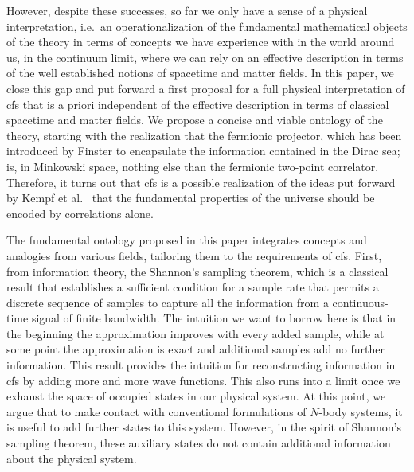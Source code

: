\documentclass[reqno,11pt]{amsart}
\numberwithin{equation}{section}
\begin{document}
However, despite these successes, so far we only have a sense of a physical interpretation, i.e.~an operationalization
of the fundamental mathematical objects of the theory in terms of concepts we have experience with in the world around us,
in the continuum limit, where we can rely on an effective description in terms of the well established notions of spacetime and matter fields.
In this paper, we close this gap and put forward a first proposal for a full physical interpretation of \ac{cfs} that is a priori independent of the effective description in terms of classical spacetime and matter fields.
We propose a concise and viable ontology of the theory, starting with the realization that the fermionic projector, which has
been introduced by Finster to encapsulate the information contained in the Dirac sea; is, in Minkowski space, nothing else
than the fermionic two-point correlator.
Therefore, it turns out that \ac{cfs} is a possible realization of the ideas put forward by Kempf et al.~\cite{kempf2021correlational,reitz2023model} that the
fundamental properties of the universe should be encoded by correlations alone.

The fundamental ontology proposed in this paper integrates concepts and analogies from various fields, tailoring them to
the requirements of \ac{cfs}.
First, from information theory, the Shannon's sampling theorem, which is a classical result that establishes a
sufficient condition for a sample rate that permits a discrete sequence of samples to capture all the information from a
continuous-time signal of finite bandwidth.
The intuition we want to borrow here is that in the beginning the approximation improves with every added sample, while
at some point the approximation is exact and additional samples add no further information.
This result provides the intuition for reconstructing information in \ac{cfs} by adding more and more wave functions.
This also runs into a limit once we exhaust the space of occupied states in our physical system.
At this point, we argue that to make contact with conventional formulations of $N$-body systems, it is useful to add further
states to this system.
However, in the spirit of Shannon's sampling theorem, these auxiliary states do not contain additional information about
the physical system.
\end{document}
